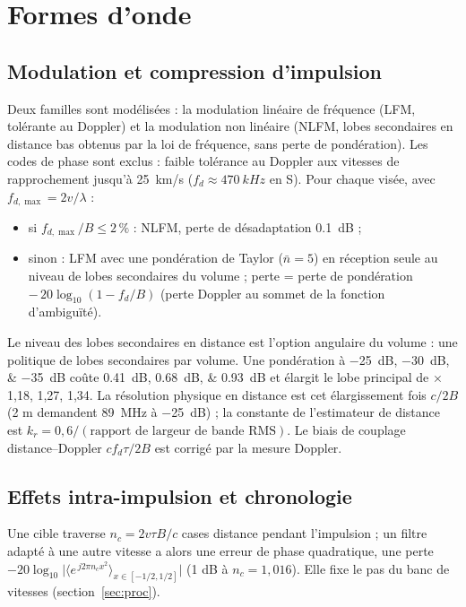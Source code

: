\documentclass[11pt,a4paper]{article}
\begin{document}
\section{Formes d'onde}\label{sec:wf}

\subsection{Modulation et compression d'impulsion}
Deux familles sont modélisées : la modulation linéaire de fréquence (LFM, tolérante au Doppler) et la modulation non
linéaire (NLFM, lobes secondaires en distance bas obtenus par la loi de fréquence, sans perte de pondération). Les codes
de phase sont exclus : faible tolérance au Doppler aux vitesses de rapprochement jusqu'à \SI{25}{km/s}
($f_d \approx \SI{470}{kHz}$ en S). Pour chaque visée, avec $f_{d,\max} = 2v/\lambda$ :
\begin{itemize}
  \item si $f_{d,\max}/B \le 2\,\%$ : NLFM, perte de désadaptation \SI{0.1}{dB} ;
  \item sinon : LFM avec une pondération de Taylor ($\bar n = 5$) en réception seule au niveau de lobes secondaires du
        volume ; perte = perte de pondération $-\,20\log_{10}(1-f_d/B)$ (perte Doppler au sommet de la fonction
        d'ambiguïté).
\end{itemize}
Le niveau des lobes secondaires en distance est l'option angulaire du volume : une politique de lobes secondaires par
volume. Une pondération à \SIlist{-25;-30;-35}{dB} coûte \SIlist{0.41;0.68;0.93}{dB} et élargit le lobe principal de
$\times$1,18, 1,27, 1,34. La résolution physique en distance est cet élargissement fois $c/2B$ (2 m demandent
\SI{89}{MHz} à \SI{-25}{dB}) ; la constante de l'estimateur de distance est $k_r = 0,6/(\text{rapport de largeur de
bande RMS})$. Le biais de couplage distance--Doppler $c f_d \tau/2B$ est corrigé par la mesure Doppler.

\subsection{Effets intra-impulsion et chronologie}
Une cible traverse $n_c = 2v\tau B/c$ cases distance pendant l'impulsion ; un filtre adapté à une autre vitesse a alors
une erreur de phase quadratique, une perte $-20\log_{10}\bigl|\langle e^{\,j2\pi n_c x^2}\rangle_{x\in[-1/2,1/2]}\bigr|$
(1 dB à $n_c = 1,016$). Elle fixe le pas du banc de vitesses (section~\ref{sec:proc}).
\end{document}
